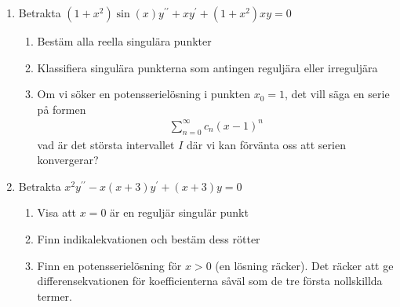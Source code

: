 \begin{enumerate}

  \item Betrakta $(1+x^2)\sin(x)y^{\prime\prime}+xy^{\prime}+(1+x^2)xy=0$

    \begin{enumerate}

      \item Bestäm alla reella singulära punkter
      \item Klassifiera singulära punkterna som antingen reguljära eller irreguljära
      \item Om vi söker en potensserielösning i punkten $x_0=1$, det vill säga en serie på formen
        \begin{equation*}
          \begin{gathered}
            \sum_{n=0}^{\infty}c_n(x-1)^n
          \end{gathered}
        \end{equation*}
        \noindent vad är det största intervallet $I$ där vi kan förvänta oss att serien konvergerar?

    \end{enumerate}
    \par\bigskip

  \item Betrakta $x^2y^{\prime\prime}-x(x+3)y^{\prime}+(x+3)y=0$

    \begin{enumerate}

      \item Visa att $x=0$ är en reguljär singulär punkt
      \item Finn indikalekvationen och bestäm dess rötter
      \item Finn en potensserielösning för $x>0$ (en lösning räcker). Det räcker att ge differensekvationen för koefficienterna såväl som de tre första nollskillda termer. 

    \end{enumerate}

\end{enumerate}
